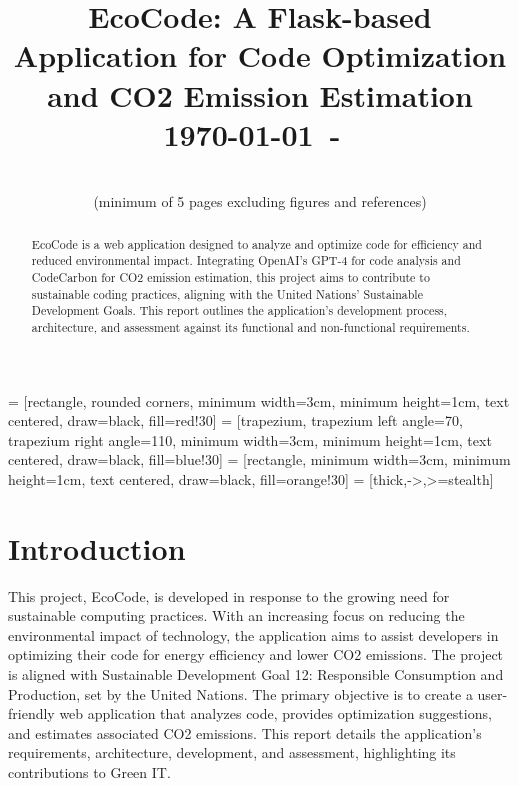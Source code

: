 \documentclass[conference,compsoc]{IEEEtran}
\begin{document}
\usetikzlibrary{shapes.geometric, arrows}

 = [rectangle, rounded corners, minimum width=3cm, minimum height=1cm, text centered, draw=black, fill=red!30]
 = [trapezium, trapezium left angle=70, trapezium right angle=110, minimum width=3cm, minimum height=1cm, text centered, draw=black, fill=blue!30]
 = [rectangle, minimum width=3cm, minimum height=1cm, text centered, draw=black, fill=orange!30]
 = [thick,->,>=stealth]

\title{EcoCode: A Flask-based Application for Code Optimization and CO2 Emission Estimation\\
{\small \today~-~\currenttime}}

\author{
	\\
	(minimum of 5 pages excluding figures and references)\\}

\maketitle

\begin{abstract}
	EcoCode is a web application designed to analyze and optimize  code for efficiency and reduced environmental impact. Integrating OpenAI's GPT-4 for code analysis and CodeCarbon for CO2 emission estimation, this project aims to contribute to sustainable coding practices, aligning with the United Nations' Sustainable Development Goals. This report outlines the application's development process, architecture, and assessment against its functional and non-functional requirements.
\end{abstract}


\section{Introduction}

This project, EcoCode, is developed in response to the growing need for sustainable computing practices. With an increasing focus on reducing the environmental impact of technology, the application aims to assist developers in optimizing their code for energy efficiency and lower CO2 emissions. The project is aligned with Sustainable Development Goal 12: Responsible Consumption and Production, set by the United Nations. The primary objective is to create a user-friendly web application that analyzes  code, provides optimization suggestions, and estimates associated CO2 emissions. This report details the application's requirements, architecture, development, and assessment, highlighting its contributions to Green IT.
\end{document}
